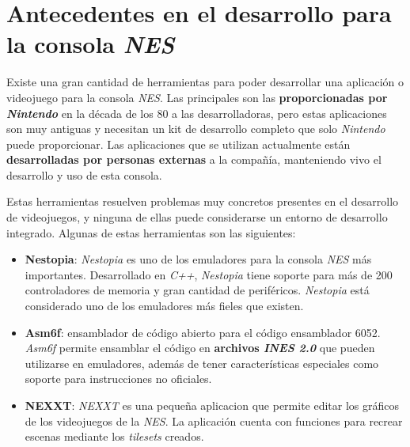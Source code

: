 \section{Antecedentes en el desarrollo para la consola \textit{NES}}
\label{sec:antecedentes-en-el-desarrollo-para-la-consola-nes}

Existe una gran cantidad de herramientas para poder desarrollar
una aplicación o videojuego para la consola \textit{NES}\cite{NES}.
Las principales son las \textbf{proporcionadas por \textit{Nintendo}}
en la década de los 80 a las desarrolladoras, pero estas
aplicaciones son muy antiguas y necesitan un kit de desarrollo
completo que solo \textit{Nintendo} puede proporcionar.
Las aplicaciones que se utilizan actualmente están
\textbf{desarrolladas por personas externas} a la compañía,
manteniendo vivo el desarrollo y uso de esta consola.

Estas herramientas resuelven problemas muy concretos
presentes en el desarrollo de videojuegos, y ninguna
de ellas puede considerarse un entorno de desarrollo integrado.
Algunas de estas herramientas son las siguientes:

\begin{itemize}
    \item \textbf{Nestopia}\cite{NESTOPIA}:
    \textit{Nestopia} es uno de los emuladores
    para la consola \textit{NES} más importantes.
    Desarrollado en \textit{C++}, \textit{Nestopia} tiene soporte
    para más de 200 controladores de memoria y gran cantidad de periféricos.
    \emph{Nestopia} está considerado uno de los emuladores más
    fieles que existen.
    \item \textbf{Asm6f}\cite{ASM6F}:
    ensamblador de código abierto
    para el código ensamblador 6052.
    \textit{Asm6f} permite ensamblar el código en
    \textbf{archivos \textit{INES 2.0}}
    que pueden utilizarse en emuladores, además
    de tener características especiales como soporte
    para instrucciones no oficiales.
    \item \textbf{NEXXT}: \textit{NEXXT} es una pequeña
    aplicacion que permite editar los gráficos de los
    videojuegos de la \textit{NES}.
    La aplicación cuenta con funciones para recrear escenas
    mediante los \textit{tilesets} creados.
\end{itemize}
